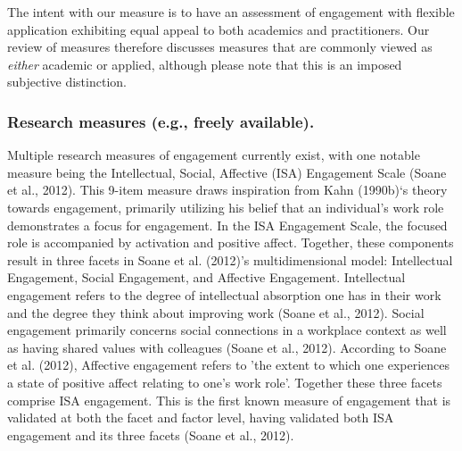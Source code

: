 \documentclass[
  man]{apa6}
\begin{document}
The intent with our measure is to have an assessment of engagement with flexible application exhibiting equal appeal to both academics and practitioners. Our review of measures therefore discusses measures that are commonly viewed as \emph{either} academic or applied, although please note that this is an imposed subjective distinction.

\hypertarget{research-measures-e.g.-freely-available.}{%
\subsubsection{Research measures (e.g., freely available).}\label{research-measures-e.g.-freely-available.}}

Multiple research measures of engagement currently exist, with one notable measure being the Intellectual, Social, Affective (ISA) Engagement Scale (Soane et al., 2012). This 9-item measure draws inspiration from Kahn (1990b)`s theory towards engagement, primarily utilizing his belief that an individual's work role demonstrates a focus for engagement. In the ISA Engagement Scale, the focused role is accompanied by activation and positive affect. Together, these components result in three facets in Soane et al. (2012)'s multidimensional model: Intellectual Engagement, Social Engagement, and Affective Engagement. Intellectual engagement refers to the degree of intellectual absorption one has in their work and the degree they think about improving work (Soane et al., 2012). Social engagement primarily concerns social connections in a workplace context as well as having shared values with colleagues (Soane et al., 2012). According to Soane et al. (2012), Affective engagement refers to 'the extent to which one experiences a state of positive affect relating to one's work role'. Together these three facets comprise ISA engagement. This is the first known measure of engagement that is validated at both the facet and factor level, having validated both ISA engagement and its three facets (Soane et al., 2012).
\end{document}
